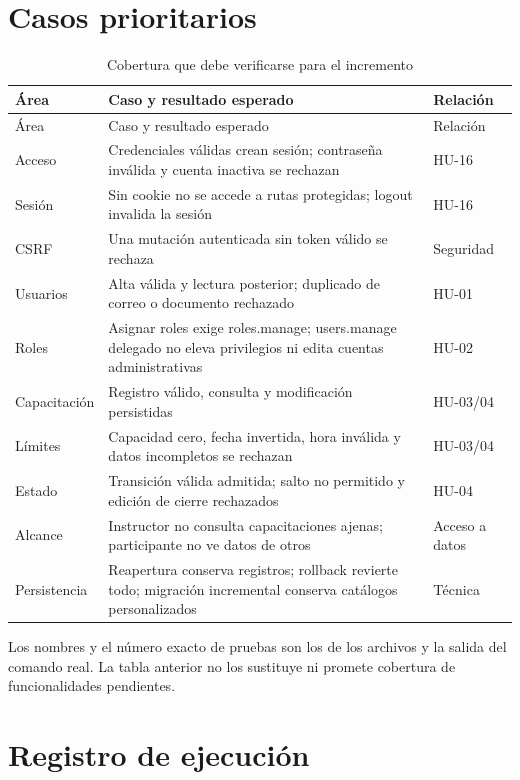 \section{Casos prioritarios}
\begin{longtable}{P{2.2cm}P{7.7cm}P{2.4cm}}
\caption{Cobertura que debe verificarse para el incremento}\\
\toprule Área & Caso y resultado esperado & Relación \\ \midrule
\endfirsthead
\toprule Área & Caso y resultado esperado & Relación \\ \midrule
\endhead
Acceso & Credenciales válidas crean sesión; contraseña inválida y cuenta inactiva se rechazan & HU-16 \\
Sesión & Sin cookie no se accede a rutas protegidas; logout invalida la sesión & HU-16 \\
CSRF & Una mutación autenticada sin token válido se rechaza & Seguridad \\
Usuarios & Alta válida y lectura posterior; duplicado de correo o documento rechazado & HU-01 \\
Roles & Asignar roles exige roles.manage; users.manage delegado no eleva privilegios ni edita cuentas administrativas & HU-02 \\
Capacitación & Registro válido, consulta y modificación persistidas & HU-03/04 \\
Límites & Capacidad cero, fecha invertida, hora inválida y datos incompletos se rechazan & HU-03/04 \\
Estado & Transición válida admitida; salto no permitido y edición de cierre rechazados & HU-04 \\
Alcance & Instructor no consulta capacitaciones ajenas; participante no ve datos de otros & Acceso a datos \\
Persistencia & Reapertura conserva registros; rollback revierte todo; migración incremental conserva catálogos personalizados & Técnica \\
\bottomrule
\end{longtable}

Los nombres y el número exacto de pruebas son los de los archivos y la salida del comando real. La tabla anterior no los sustituye ni promete cobertura de funcionalidades pendientes.

\section{Registro de ejecución}


